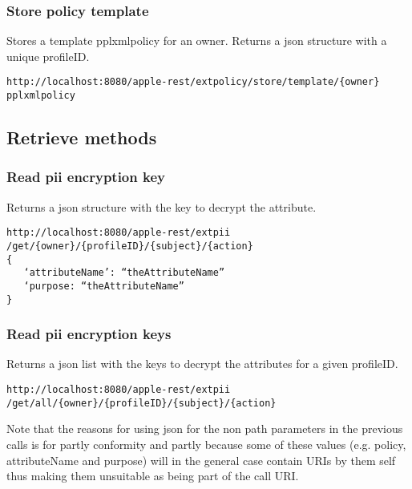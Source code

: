\subsubsection{Store policy template}
Stores a template pplxmlpolicy for an owner. Returns a json structure with a unique profileID.
\begin{verbatim}
http://localhost:8080/apple-rest/extpolicy/store/template/{owner}
pplxmlpolicy
\end{verbatim}

\subsection{Retrieve methods}
\subsubsection{Read pii encryption key}
Returns a json structure with the key to decrypt the attribute.
\begin{verbatim}
http://localhost:8080/apple-rest/extpii /get/{owner}/{profileID}/{subject}/{action}
{ 
   ‘attributeName’: “theAttributeName”
   ‘purpose: “theAttributeName”
}
\end{verbatim}

\subsubsection{Read pii encryption keys}
Returns a json list with the keys to decrypt the attributes for a given profileID.
\begin{verbatim}
http://localhost:8080/apple-rest/extpii /get/all/{owner}/{profileID}/{subject}/{action}
\end{verbatim}

Note that the reasons for using json for the non path parameters in the previous calls is for partly conformity and partly because some of these values (e.g. policy, attributeName and purpose) will in the general case contain URIs by them self thus making them unsuitable as being part of the call URI.
